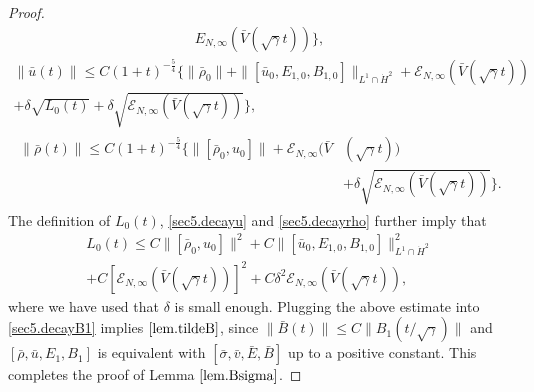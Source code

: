 \documentclass[11pt]{amsart}
\numberwithin{equation}{section}
\begin{document}
\begin{proof}
\begin{multline}
{{E}_{N,\infty}(\bar{V}(\sqrt{\gamma}t))}\Big\},
\end{multline}
\begin{multline}\label{sec5.decayu}
 \|\bar{u}(t)\|\leq C (1+t)^{-\frac{5}{4}}\Big\{
 \|\bar{\rho}_{0}\|+\|[\bar{u}_{0}, E_{1,0},B_{1,0}]\|_{L^{1}\cap\dot{H}^{2}}+\mathcal
{E}_{N,\infty}(\bar{V}(\sqrt{\gamma}t))\\
+\delta\sqrt{L_{0}(t)}+\delta \sqrt{\mathcal
{E}_{N,\infty}(\bar{V}(\sqrt{\gamma}t))}\Big\},
\end{multline}
\begin{eqnarray}\label{sec5.decayrho}
\begin{aligned}
 \|\bar{\rho}(t)\|\leq C (1+t)^{-\frac{5}{4}}\Big\{
 \|[\bar{\rho}_{0},u_{0}]\|+\mathcal
{E}_{N,\infty}(\bar{V}&(\sqrt{\gamma}t))\\
&+\delta \sqrt{\mathcal
{E}_{N,\infty}(\bar{V}(\sqrt{\gamma}t))}\Big\}.
\end{aligned}
\end{eqnarray}
The definition of $L_{0}(t)$, \eqref{sec5.decayu} and
\eqref{sec5.decayrho} further imply that
\begin{multline}\label{bou.L}
L_{0}(t)\leq C\|[\bar{\rho}_{0},u_{0}]\|^{2}+C\|[\bar{u}_{0},
E_{1,0},B_{1,0}]\|_{L^{1}\cap\dot{H}^{2}}^{2}\\
+C\left[\mathcal
{E}_{N,\infty}(\bar{V}(\sqrt{\gamma}t))\right]^{2}+C\delta^{2}\mathcal
{E}_{N,\infty}(\bar{V}(\sqrt{\gamma}t)),
\end{multline}
where we have used that $\delta$ is small enough. Plugging the above
estimate into  \eqref{sec5.decayB1} implies $\eqref{lem.tildeB}$,
since $\|\bar{ B}(t)\|\leq C \| B_{1}(t/\sqrt{\gamma})\|$ and
$[\bar{\rho},\bar{u},E_{1},B_{1}]$ is equivalent with
$[\bar{\sigma},\bar{v},\bar{E},\bar{B}]$ up to a positive constant.
This completes the proof of Lemma $\ref{lem.Bsigma}$.
\end{proof}
\end{document}
